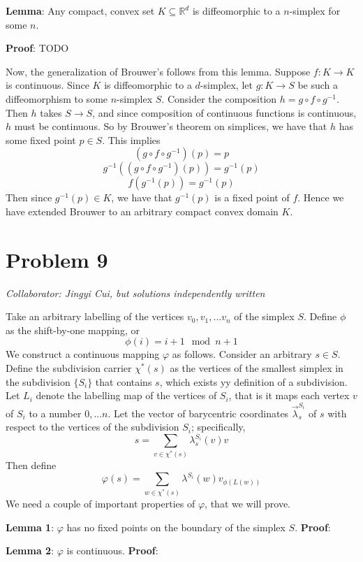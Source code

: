 \documentclass[10pt,letter]{article}
\begin{document}
\textbf{Lemma}: Any compact, convex set $K \subseteq \mathbb{R}^d$ is diffeomorphic to a $n$-simplex for some $n$.

\textbf{Proof}: TODO

Now, the generalization of Brouwer's follows from this lemma. Suppose $f: K \to K$ is continuous. Since $K$ is diffeomorphic to a $d$-simplex, let $g: K \to S$ be such a diffeomorphism to some $n$-simplex $S$. Consider the composition $h = g\circ f \circ g^{-1}$. Then $h$ takes $S \to S$, and since composition of continuous functions is continuous, $h$ must be continuous. So by Brouwer's theorem on simplices, we have that $h$ has some fixed point $p \in S$. This implies
\[ (g \circ f \circ g^{-1}) (p) = p \]
\[ g^{-1}((g \circ f \circ g^{-1}) (p)) = g^{-1}(p)\]
\[ f(g^{-1}(p)) = g^{-1}(p) \]
Then since $g^{-1}(p) \in K$, we have that $g^{-1}(p)$ is a fixed point of $f$. Hence we have extended Brouwer to an arbitrary compact convex domain $K$.
\section*{Problem 9}
\textit{Collaborator: Jingyi Cui, but solutions independently written}

Take an arbitrary labelling of the vertices $v_0, v_1, ... v_n$ of the simplex $S$. Define $\phi$ as the shift-by-one mapping, or \[ \phi(i) = i + 1 \mod {n+1} \]
We construct a continuous mapping $\varphi$ as follows. Consider an arbitrary $s \in S$. Define the subdivision carrier $\chi^*(s)$ as the vertices of the smallest simplex in the subdivision $\{ S_i \}$ that contains $s$, which exists yy definition of a subdivision. Let $L_i$ denote the labelling map of the vertices of $S_i$, that is it maps each vertex $v$ of $S_i$ to a number $0, ... n$. Let the vector of barycentric coordinates $\vec{\lambda}^{S_i}_s$ of $s$ with respect to the vertices of the subdivision $S_i$; specifically,
\[ s = \sum_{v \in \chi^*(s) } \lambda^{S_i}_s(v) v  \]
Then define
\[ \varphi(s) = \sum_{w \in \chi^*(s) } \lambda^{S_i}(w) v_{\phi(L(w))} \]
We need a couple of important properties of $\varphi$, that we will prove.

\textbf{Lemma 1}: $\varphi$ has no fixed points on the boundary of the simplex $S$.
\textbf{Proof}:

\textbf{Lemma 2}: $\varphi$ is continuous.
\textbf{Proof}:
\end{document}
